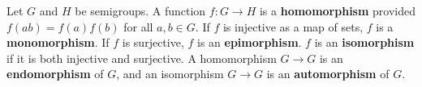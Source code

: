 \begin{definition}
Let $G$ and $H$ be semigroups. A function $f: G \rightarrow H$ is a \textbf{homomorphism} provided $f(ab) = f(a)f(b)$ for all $a,b \in G$. If $f$ is injective as a map of sets, $f$ is a \textbf{monomorphism}. If $f$ is surjective, $f$ is an \textbf{epimorphism}. $f$ is an \textbf{isomorphism} if it is both injective and surjective. A homomorphism $G \rightarrow G$ is an \textbf{endomorphism} of $G$, and an isomorphism $G \rightarrow G$ is an \textbf{automorphism} of $G$.
\end{definition}
